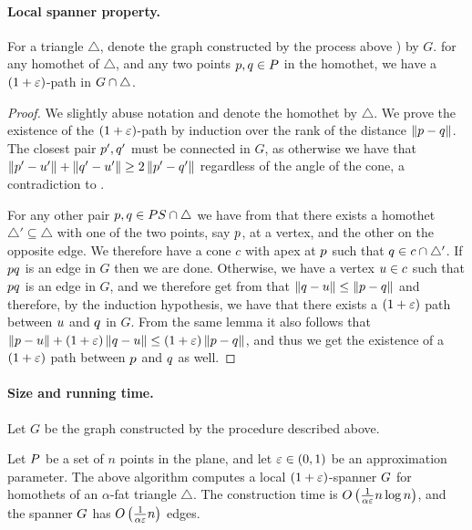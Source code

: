 \documentclass[12pt]{article}%
\begin{document}
\paragraph{Local spanner property.}
\begin{lemma}
    For a triangle $\triangle$, denote the graph constructed by the
    process above ) by $G$. for any homothet
    of $\triangle$, and any two points $p, q \in P$ in the
    homothet, we have a $(1+\varepsilon)$-path in
    $G \cap {\triangle}$.
\end{lemma}



\begin{proof}
    We slightly abuse notation and denote the homothet by
    $\triangle$. We prove the existence of the $(1+\varepsilon)$-path by
    induction over the rank of the distance $\left\| p - q \right\|$. The
    closest pair $p',q'$ must be connected in $G$, as otherwise we
    have that $\left\| p' - u' \right\|+\left\| q' - u' \right\|\geq 2 \left\| p' - q' \right\|$
    regardless of the angle of the cone, a contradiction to
    .

    For any other pair $p,q\in PS\cap \triangle$ we have from
     that there exists a homothet
    $\triangle'\subseteq \triangle$ with one of the two points, say
    $p$, at a vertex, and the other on the opposite edge. We
    therefore have a cone $c$ with apex at $p$ such that
    $q\in c\cap \triangle'$. If $pq$ is an edge in $G$ then we
    are done. Otherwise, we have a vertex $u\in c$ such that
    $pq$ is an edge in $G$, and we therefore get from
     that
    $\left\| q - u \right\|\leq \left\| p - q \right\|$ and therefore, by the induction
    hypothesis, we have that there exists a $(1+\varepsilon)$ path between
    $u$ and $q$ in $G$. From the same lemma it also follows that
    $\left\| p - u \right\|+(1+\varepsilon)\left\| q - u \right\|\leq(1+\varepsilon)\left\| p - q \right\|$,
    and thus we get the existence of a $(1+\varepsilon)$ path between $p$
    and $q$ as well.

\end{proof}


\paragraph{Size and running time.}
Let $G$ be the graph constructed by the procedure described above.


\begin{theorem}
    Let $P$ be a set of $n$ points in the plane, and let
    $\varepsilon \in (0,1)$ be an approximation parameter. The above
    algorithm computes a local $(1+\varepsilon)$-spanner $G$ for homothets
    of an $\alpha$-fat triangle $\triangle$.  The construction time is
    $O\left(\frac{1}{\alpha\varepsilon}n\log n\right)$, and the spanner $G$
    has $O\left(\frac{1}{\alpha\varepsilon}n\right)$ edges.
\end{theorem}
\end{document}
